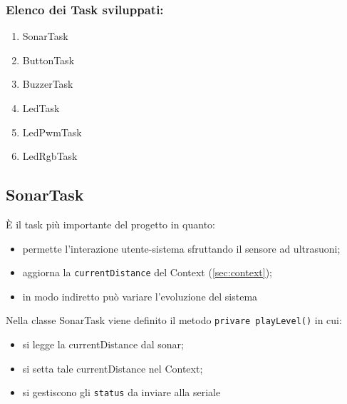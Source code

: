 \subsubsection{Elenco dei Task sviluppati:}
\begin{enumerate}
	\item SonarTask
	\item ButtonTask
	\item BuzzerTask
	\item LedTask
	\item LedPwmTask
	\item LedRgbTask
\end{enumerate}

\subsection{SonarTask}
È il task più importante del progetto in quanto:
\begin{itemize}
	\item permette l'interazione utente-sistema sfruttando il sensore ad ultrasuoni;
	\item aggiorna la \texttt{currentDistance} del Context (\ref{sec:context});
	\item in modo indiretto può variare l'evoluzione del sistema
\end{itemize}
Nella classe SonarTask viene definito il metodo \texttt{privare playLevel()} in cui:
\begin{itemize}
	\item si legge la currentDistance dal sonar;
	\item si setta tale currentDistance nel Context;
	\item si gestiscono gli \texttt{status} da inviare alla seriale
\end{itemize}

